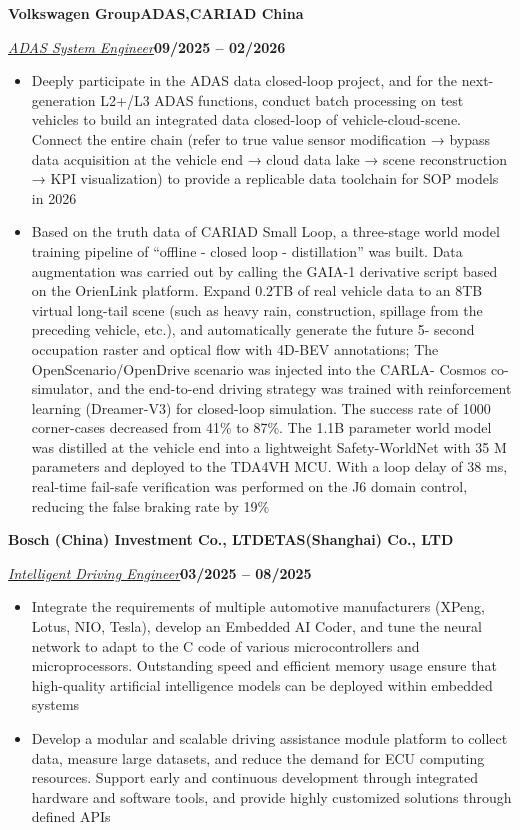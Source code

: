 \documentclass[10pt,a4paper]{article}
\newcommand{\jobcompany}[2]{\par\vspace{1.92bp}\noindent\textbf{#1}\hfill\textbf{#2}\par\vspace{1.44bp}}
\newcommand{\roleline}[2]{\par\noindent\uline{\textit{#1}}\hfill\textbf{#2}\par}
\newenvironment{cvitems}{%
  \begin{itemize}[leftmargin=14.20bp,labelwidth=4.20bp,labelsep=10.00bp,align=left,
    topsep=0bp,itemsep=0bp,parsep=0bp,partopsep=0bp,label={\textbullet}]
}{\end{itemize}}
\begin{document}
\jobcompany{Volkswagen Group}{ADAS,CARIAD China}
\roleline{ADAS System Engineer}{09/2025 -- 02/2026}
\begin{cvitems}
\item Deeply participate in the ADAS data closed-loop project, and for the next-generation L2+/L3 ADAS functions, conduct batch processing on test vehicles to build an integrated data closed-loop of vehicle-cloud-scene. Connect the entire chain (refer to true value sensor modification → bypass data acquisition at the vehicle end → cloud data lake → scene reconstruction → KPI visualization) to provide a replicable data toolchain for SOP models in 2026
\item Based on the truth data of CARIAD Small Loop, a three-stage world model training pipeline of ``offline - closed loop - distillation'' was built. Data augmentation was carried out by calling the GAIA-1 derivative script based on the OrienLink platform. Expand 0.2TB of real vehicle data to an\newpage
8TB virtual long-tail scene (such as heavy rain, construction, spillage from the preceding vehicle, etc.), and automatically generate the future 5-\linebreak
second occupation raster and optical flow with 4D-BEV annotations; The OpenScenario/OpenDrive scenario was injected into the CARLA-\linebreak
Cosmos co-simulator, and the end-to-end driving strategy was trained with reinforcement learning (Dreamer-V3) for closed-loop simulation. The\linebreak
success rate of 1000 corner-cases decreased from 41\% to 87\%. The 1.1B parameter world model was distilled at the vehicle end into a lightweight\linebreak
Safety-WorldNet with 35 M parameters and deployed to the TDA4VH MCU. With a loop delay of 38 ms, real-time fail-safe verification was\linebreak
performed on the J6 domain control, reducing the false braking rate by 19\%
\end{cvitems}

\jobcompany{Bosch (China) Investment Co., LTD}{ETAS(Shanghai) Co., LTD}
\roleline{Intelligent Driving Engineer}{03/2025 -- 08/2025}
\begin{cvitems}
\item Integrate the requirements of multiple automotive manufacturers (XPeng, Lotus, NIO, Tesla), develop an Embedded AI Coder, and tune the neural network to adapt to the C code of various microcontrollers and microprocessors. Outstanding speed and efficient memory usage ensure that high-quality artificial intelligence models can be deployed within embedded systems
\item Develop a modular and scalable driving assistance module platform to collect data, measure large datasets, and reduce the demand for ECU computing resources. Support early and continuous development through integrated hardware and software tools, and provide highly customized solutions through defined APIs
\end{cvitems}
\end{document}
